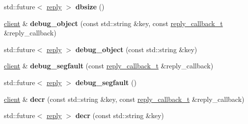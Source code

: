 \begin{DoxyCompactItemize}
\item 
\mbox{\label{classcpp__redis_1_1client_aa9169c3c4a8b3ec5ee7b7bc601ae8a52}} 
std\+::future$<$ \hyperlink{classcpp__redis_1_1reply}{reply} $>$ {\bfseries dbsize} ()
\item 
\mbox{\label{classcpp__redis_1_1client_ad96e4d369e87e858fd7a8296b5cc378e}} 
\hyperlink{classcpp__redis_1_1client}{client} \& {\bfseries debug\+\_\+object} (const std\+::string \&key, const \hyperlink{classcpp__redis_1_1client_a061a1140d36d2eaeda82b09a0bb3f9f2}{reply\+\_\+callback\+\_\+t} \&reply\+\_\+callback)
\item 
\mbox{\label{classcpp__redis_1_1client_a9d7a2eae091f99db6b5479577de0bf99}} 
std\+::future$<$ \hyperlink{classcpp__redis_1_1reply}{reply} $>$ {\bfseries debug\+\_\+object} (const std\+::string \&key)
\item 
\mbox{\label{classcpp__redis_1_1client_ac5d06ca1072ef1a83a8843c448e4d1e3}} 
\hyperlink{classcpp__redis_1_1client}{client} \& {\bfseries debug\+\_\+segfault} (const \hyperlink{classcpp__redis_1_1client_a061a1140d36d2eaeda82b09a0bb3f9f2}{reply\+\_\+callback\+\_\+t} \&reply\+\_\+callback)
\item 
\mbox{\label{classcpp__redis_1_1client_a764786e7003c538a6cf0a5d6b44d66dd}} 
std\+::future$<$ \hyperlink{classcpp__redis_1_1reply}{reply} $>$ {\bfseries debug\+\_\+segfault} ()
\item 
\mbox{\label{classcpp__redis_1_1client_a8e09d5753d9f9ba00b1d5e8aed306189}} 
\hyperlink{classcpp__redis_1_1client}{client} \& {\bfseries decr} (const std\+::string \&key, const \hyperlink{classcpp__redis_1_1client_a061a1140d36d2eaeda82b09a0bb3f9f2}{reply\+\_\+callback\+\_\+t} \&reply\+\_\+callback)
\item 
\mbox{\label{classcpp__redis_1_1client_ac80abd9a238a7613294d4444bbc92907}} 
std\+::future$<$ \hyperlink{classcpp__redis_1_1reply}{reply} $>$ {\bfseries decr} (const std\+::string \&key)
\item 
\mbox{\label{classcpp__redis_1_1client_aaa45a662abeaa66f5a8c985cd27957c8}} 

\end{DoxyCompactItemize}
